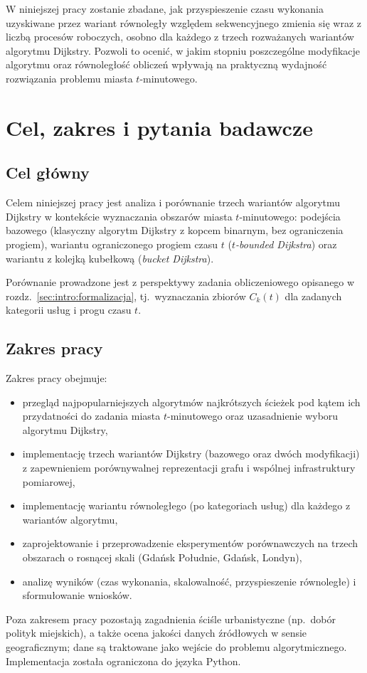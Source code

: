 W niniejszej pracy zostanie zbadane, jak przyspieszenie czasu wykonania uzyskiwane przez wariant
równoległy względem sekwencyjnego zmienia się wraz z liczbą procesów roboczych, osobno dla każdego
z trzech rozważanych wariantów algorytmu Dijkstry. Pozwoli to ocenić, w jakim stopniu poszczególne
modyfikacje algorytmu oraz równoległość obliczeń wpływają na praktyczną wydajność rozwiązania
problemu miasta $t$-minutowego.

\section{Cel, zakres i pytania badawcze}
\label{sec:intro:cel}

\subsection{Cel główny}

Celem niniejszej pracy jest analiza i porównanie trzech wariantów algorytmu Dijkstry
w kontekście wyznaczania obszarów miasta $t$-minutowego:
podejścia bazowego (klasyczny algorytm Dijkstry z kopcem binarnym, bez ograniczenia progiem),
wariantu ograniczonego progiem czasu $t$ (\emph{$t$-bounded Dijkstra})
oraz wariantu z kolejką kubełkową (\emph{bucket Dijkstra}).

Porównanie prowadzone jest z perspektywy zadania obliczeniowego opisanego w
rozdz.\ \ref{sec:intro:formalizacja}, tj.\ wyznaczania zbiorów $C_k(t)$
dla zadanych kategorii usług i progu czasu $t$.

\subsection{Zakres pracy}

Zakres pracy obejmuje:
\begin{itemize}
  \item przegląd najpopularniejszych algorytmów najkrótszych ścieżek pod kątem ich przydatności
        do zadania miasta $t$-minutowego oraz uzasadnienie wyboru algorytmu Dijkstry,
  \item implementację trzech wariantów Dijkstry (bazowego oraz dwóch modyfikacji)
        z zapewnieniem porównywalnej reprezentacji grafu i wspólnej infrastruktury pomiarowej,
  \item implementację wariantu równoległego (po kategoriach usług) dla każdego z wariantów algorytmu,
  \item zaprojektowanie i przeprowadzenie eksperymentów porównawczych na trzech obszarach
        o rosnącej skali (Gdańsk Południe, Gdańsk, Londyn),
  \item analizę wyników (czas wykonania, skalowalność, przyspieszenie równoległe)
        i sformułowanie wniosków.
\end{itemize}
Poza zakresem pracy pozostają zagadnienia ściśle urbanistyczne (np.\ dobór polityk miejskich),
a także ocena jakości danych źródłowych w sensie geograficznym; dane są traktowane jako wejście
do problemu algorytmicznego. Implementacja została ograniczona do języka Python.


